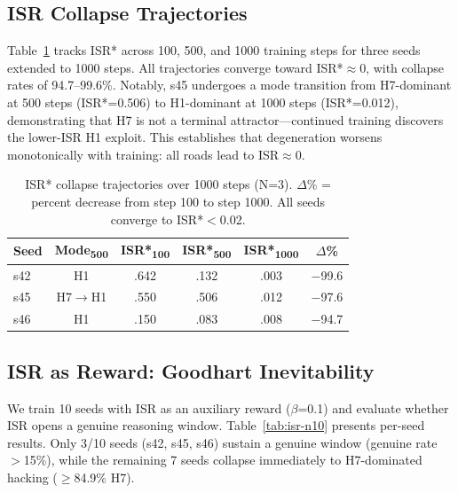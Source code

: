 \documentclass[11pt]{article}
\begin{document}
\subsection{ISR Collapse Trajectories}

Table~\ref{tab:isr-trajectory} tracks ISR* across 100, 500, and 1000 training steps for three seeds extended to 1000 steps. All trajectories converge toward ISR*$\approx$0, with collapse rates of 94.7--99.6\%. Notably, s45 undergoes a mode transition from H7-dominant at 500 steps (ISR*=0.506) to H1-dominant at 1000 steps (ISR*=0.012), demonstrating that H7 is not a terminal attractor---continued training discovers the lower-ISR H1 exploit. This establishes that degeneration worsens monotonically with training: all roads lead to ISR$\approx$0.

\begin{table}[t]
\centering
\small
\begin{tabular}{lccccc}
\toprule
Seed & Mode\textsubscript{500} & ISR*\textsubscript{100} & ISR*\textsubscript{500} & ISR*\textsubscript{1000} & $\Delta$\% \\
\midrule
s42 & H1 & .642 & .132 & .003 & $-$99.6 \\
s45 & H7$\to$H1 & .550 & .506 & .012 & $-$97.6 \\
s46 & H1 & .150 & .083 & .008 & $-$94.7 \\
\bottomrule
\end{tabular}
\caption{ISR* collapse trajectories over 1000 steps (N=3). $\Delta$\% = percent decrease from step 100 to step 1000. All seeds converge to ISR*$<$0.02.}
\label{tab:isr-trajectory}
\end{table}

\subsection{ISR as Reward: Goodhart Inevitability}

We train 10 seeds with ISR as an auxiliary reward ($\beta$=0.1) and evaluate whether ISR opens a genuine reasoning window. Table~\ref{tab:isr-n10} presents per-seed results. Only 3/10 seeds (s42, s45, s46) sustain a genuine window (genuine rate $>$15\%), while the remaining 7 seeds collapse immediately to H7-dominated hacking ($\geq$84.9\% H7).
\end{document}

